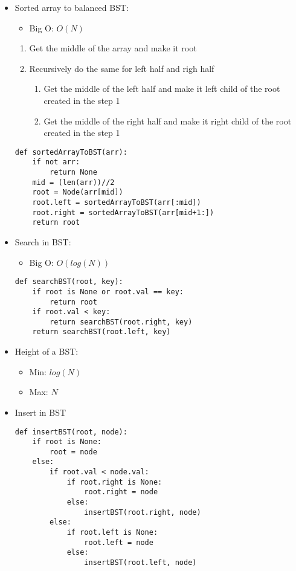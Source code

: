\documentclass[a4paper, 11.25pt]{article}
\begin{document}
\begin{itemize}
    \item Sorted array to balanced BST:
    \begin{itemize}
        \item Big O: $O(N)$
    \end{itemize}
    \begin{enumerate}
        \item Get the middle of the array and make it root
        \item Recursively do the same for left half and righ half
        \begin{enumerate}
            \item Get the middle of the left half and make it left child of the root created in the step 1
            \item Get the middle of the right half and make it right child of the root created in the step 1
        \end{enumerate}
    \end{enumerate}
    \begin{lstlisting}[style=PythonStyle]
def sortedArrayToBST(arr):
    if not arr:
        return None
    mid = (len(arr))//2
    root = Node(arr[mid])
    root.left = sortedArrayToBST(arr[:mid])
    root.right = sortedArrayToBST(arr[mid+1:])
    return root
\end{lstlisting}
    \item Search in BST:
    \begin{itemize}
        \item Big O: $O(log(N))$
    \end{itemize}
        \begin{lstlisting}[style=PythonStyle]
def searchBST(root, key):
    if root is None or root.val == key:
        return root
    if root.val < key:
        return searchBST(root.right, key)
    return searchBST(root.left, key)
\end{lstlisting}
    \item Height of a BST: 
    \begin{itemize}
        \item Min: $log(N)$
        \item Max: $N$
    \end{itemize}
    \item Insert in BST
    \begin{lstlisting}[style=PythonStyle]
def insertBST(root, node):
    if root is None:
        root = node
    else:
        if root.val < node.val:
            if root.right is None:
                root.right = node
            else:
                insertBST(root.right, node)
        else:
            if root.left is None:
                root.left = node
            else:
                insertBST(root.left, node)
\end{lstlisting}
\end{itemize}
\end{document}
